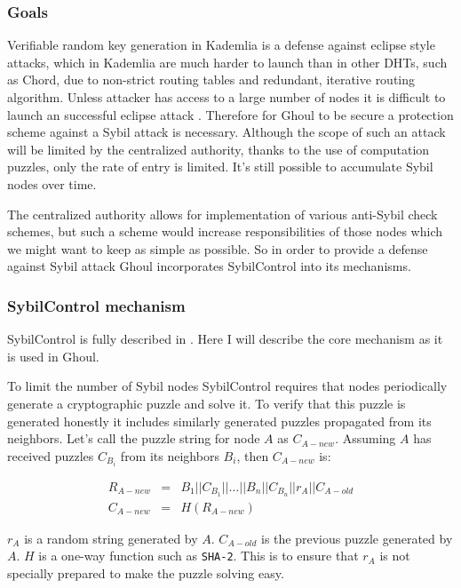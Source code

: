 \subsubsection{Goals}
  Verifiable random key generation in Kademlia is a defense against eclipse
  style attacks, which in Kademlia are much harder to launch than in other
  DHTs, such as Chord, due to non-strict routing tables and redundant, iterative
  routing algorithm. Unless attacker has access to a large number of nodes it is
  difficult to launch an successful eclipse attack \cite{mac09}. Therefore for
  Ghoul to be secure a protection scheme against a Sybil attack is necessary.
  Although the scope of such an attack will be limited by the centralized
  authority, thanks to the use of computation puzzles, only the rate of
  entry is limited. It's still possible to accumulate Sybil nodes over time.

  The centralized authority allows for implementation of various anti-Sybil
  check schemes, but such a scheme would increase responsibilities of those
  nodes which we might want to keep as simple as possible. So in order to
  provide a defense against Sybil attack Ghoul incorporates SybilControl into
  its mechanisms.

\subsubsection{SybilControl mechanism}
  SybilControl is fully described in \cite{li12}. Here I will describe the core
  mechanism as it is used in Ghoul. 

  To limit the number of Sybil nodes SybilControl requires that nodes
  periodically generate a cryptographic puzzle and solve it. To verify that
  this puzzle is generated honestly it includes similarly generated puzzles
  propagated from its neighbors. Let's call the puzzle string for node $A$ as
  $C_{A-new}$. Assuming $A$ has received puzzles $C_{B_i}$ from its neighbors
  $B_{i}$, then $C_{A-new}$ is:

  \begin{eqnarray*}
      R_{A-new} &=& B_1||C_{B_1}||\ldots||B_n||C_{B_n}||r_A||C_{A-old}\\
    C_{A-new} &=& H\left(R_{A-new}\right)
  \end{eqnarray*}

  $r_A$ is a random string generated by $A$. $C_{A-old}$ is the previous puzzle
  generated by $A$. $H$ is a one-way function such as \texttt{SHA-2}. This is to
  ensure that $r_A$ is not specially prepared to make the puzzle solving easy.

